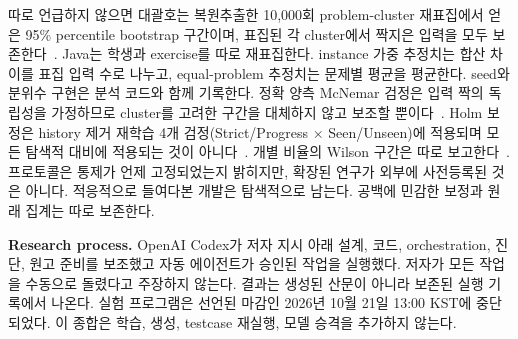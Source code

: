 \documentclass[10pt,conference]{IEEEtran}
\begin{document}
따로 언급하지 않으면 대괄호는 복원추출한 10,000회 problem-cluster 재표집에서 얻은 95\% percentile bootstrap 구간이며, 표집된 각 cluster에서 짝지은 입력을 모두 보존한다~\cite{efron1979bootstrap}. Java는 학생과 exercise를 따로 재표집한다. instance 가중 추정치는 합산 차이를 표집 입력 수로 나누고, equal-problem 추정치는 문제별 평균을 평균한다. seed와 분위수 구현은 분석 코드와 함께 기록한다. 정확 양측 McNemar 검정은 입력 짝의 독립성을 가정하므로 cluster를 고려한 구간을 대체하지 않고 보조할 뿐이다~\cite{mcnemar1947note}. Holm 보정은 history 제거 재학습 4개 검정(Strict/Progress $\times$ Seen/Unseen)에 적용되며 모든 탐색적 대비에 적용되는 것이 아니다~\cite{holm1979simple}. 개별 비율의 Wilson 구간은 따로 보고한다~\cite{wilson1927probable}. 프로토콜은 통제가 언제 고정되었는지 밝히지만, 확장된 연구가 외부에 사전등록된 것은 아니다. 적응적으로 들여다본 개발은 탐색적으로 남는다. 공백에 민감한 보정과 원래 집계는 따로 보존한다.

\noindent\textbf{Research process.} OpenAI Codex가 저자 지시 아래 설계, 코드, orchestration, 진단, 원고 준비를 보조했고 자동 에이전트가 승인된 작업을 실행했다. 저자가 모든 작업을 수동으로 돌렸다고 주장하지 않는다. 결과는 생성된 산문이 아니라 보존된 실행 기록에서 나온다. 실험 프로그램은 선언된 마감인 2026년 10월 21일 13:00 KST에 중단되었다. 이 종합은 학습, 생성, testcase 재실행, 모델 승격을 추가하지 않는다.
\end{document}
